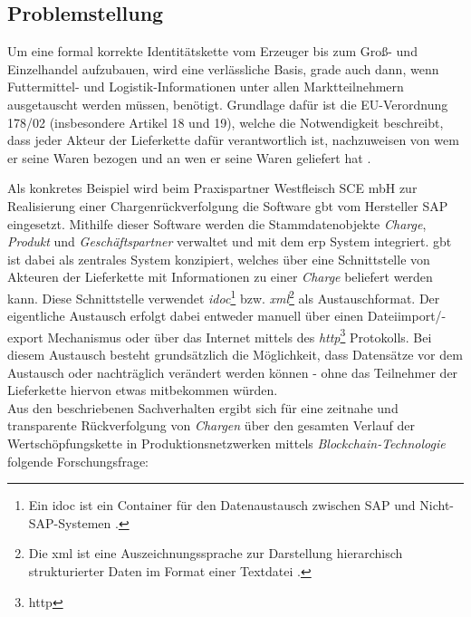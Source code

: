 \subsection{Problemstellung} \label{Problemstellung}

Um eine formal korrekte Identitätskette vom Erzeuger bis zum Groß- und Einzelhandel aufzubauen, wird eine verlässliche Basis, grade auch dann, wenn Futtermittel- und Logistik-Informationen unter allen Marktteilnehmern ausgetauscht werden müssen, benötigt. Grundlage dafür ist die EU-Verordnung 178/02 (insbesondere Artikel 18 und 19), welche die Notwendigkeit beschreibt, dass jeder Akteur der Lieferkette dafür verantwortlich ist, nachzuweisen von wem er seine Waren bezogen und an wen er seine Waren geliefert hat \citep{EPER2002}.

Als konkretes Beispiel wird beim Praxispartner Westfleisch SCE mbH zur Realisierung einer Chargenrückverfolgung die Software \ac{gbt} vom Hersteller SAP eingesetzt. Mithilfe dieser Software werden die Stammdatenobjekte \textit{Charge}, \textit{Produkt} und \textit{Geschäftspartner} verwaltet und mit dem \ac{erp} System integriert. \ac{gbt} ist dabei als zentrales System konzipiert, welches über eine Schnittstelle von Akteuren der Lieferkette mit Informationen zu einer \textit{Charge} beliefert werden kann. Diese Schnittstelle verwendet \textit{\acs{idoc}}\footnote{Ein \ac{idoc} ist ein Container für den Datenaustausch zwischen SAP und Nicht-SAP-Systemen \citep{SAP2019}.} bzw. \textit{\acs{xml}}\footnote{Die \ac{xml} ist eine Auszeichnungssprache zur Darstellung hierarchisch strukturierter Daten im Format einer Textdatei \citep{Yergeau2008}.} als Austauschformat. Der eigentliche Austausch erfolgt dabei entweder manuell über einen Dateiimport/-export Mechanismus oder über das Internet mittels des \textit{\acs{http}}\footnote{\ac{http}} Protokolls. Bei diesem Austausch besteht grundsätzlich die Möglichkeit, dass Datensätze vor dem Austausch oder nachträglich verändert werden können - ohne das Teilnehmer der Lieferkette hiervon etwas mitbekommen würden.\\

Aus den beschriebenen Sachverhalten ergibt sich für eine zeitnahe und transparente Rückverfolgung von \textit{Chargen} über den gesamten Verlauf der Wertschöpfungskette in Produktionsnetzwerken mittels \textit{Blockchain-Technologie} folgende Forschungsfrage:

